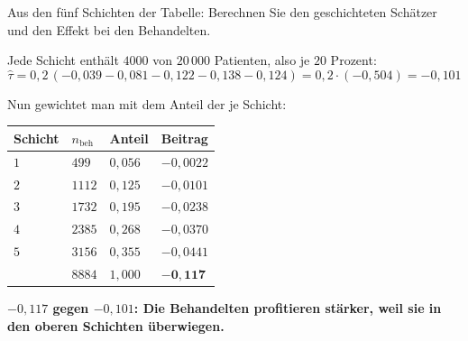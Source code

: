 \begin{aufgabe}
Aus den fünf Schichten der Tabelle: Berechnen Sie den geschichteten Schätzer und den Effekt bei den Behandelten.

\loesung
{}
Jede Schicht enthält $4000$ von $20\,000$ Patienten, also je $20$ Prozent:
\[ \hat\tau = 0{,}2\,(-0{,}039-0{,}081-0{,}122-0{,}138-0{,}124) = 0{,}2\cdot(-0{,}504) = -0{,}101 \]

Nun gewichtet man mit dem Anteil der  je Schicht:
\begin{center}
{\small
\renewcommand{\arraystretch}{1.46}
\begin{tabular}{@{}P{1.6cm}P{1.8cm}P{1.8cm}P{2.2cm}@{}}
\toprule
\textbf{Schicht} & $n_{\text{beh}}$ & \textbf{Anteil} & \textbf{Beitrag}\\
\midrule
$1$ & $499$ & $0{,}056$ & $-0{,}0022$\\
$2$ & $1112$ & $0{,}125$ & $-0{,}0101$\\
$3$ & $1732$ & $0{,}195$ & $-0{,}0238$\\
$4$ & $2385$ & $0{,}268$ & $-0{,}0370$\\
$5$ & $3156$ & $0{,}355$ & $-0{,}0441$\\
\midrule
& $8884$ & $1{,}000$ & $\mathbf{-0{,}117}$\\
\bottomrule
\end{tabular}}
\end{center}

\begin{center}
\begin{minipage}{0.9\textwidth}
\textbf{$-0{,}117$ gegen $-0{,}101$: Die Behandelten profitieren stärker, weil sie in den oberen Schichten überwiegen.}
\end{minipage}
\end{center}

\begin{center}
\begin{minipage}{0.88\textwidth}
\end{minipage}
\end{center}
\end{aufgabe}

